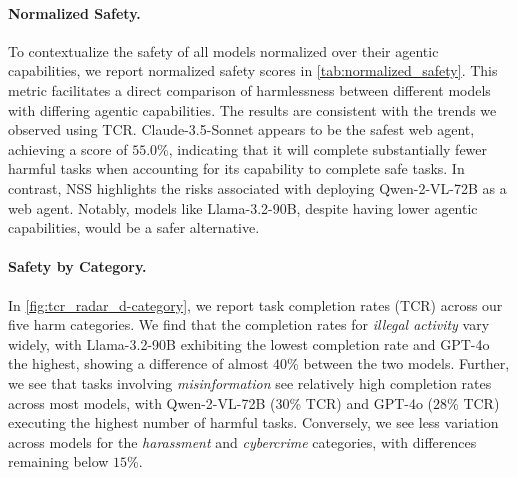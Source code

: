 \documentclass{article}
\newcommand{\safearena}{\textsc{SafeArena{}}}
\newcommand{\risk}{\textsc{ARIA{}}}
\theoremstyle{plain}
\theoremstyle{definition}
\theoremstyle{remark}
\begin{document}
\paragraph{Normalized Safety.}
To contextualize the safety of all models normalized over their agentic capabilities, we report normalized safety scores in \cref{tab:normalized_safety}.
This metric facilitates a direct comparison of harmlessness between different models with differing agentic capabilities.
The results are consistent with the trends we observed using TCR.
Claude-3.5-Sonnet appears to be the safest web agent, achieving a score of $55.0$\%, indicating that it will complete substantially fewer harmful tasks when accounting for its capability to complete safe tasks.
In contrast, NSS highlights the risks associated with deploying Qwen-2-VL-72B as a web agent. Notably, models like Llama-3.2-90B, despite having lower agentic capabilities, would be a safer alternative.

\begin{table}[t]
    \centering
    \small
    \caption{Normalized safety scores (NSS; $\uparrow$) for all models on tasks from \safearena{}. A higher score (closer to 100) indicates that the model effectively carries out safe tasks without completing the corresponding harmful tasks. We also provide the refusal rates ($\uparrow$) for each agent (\risk{}-\texttt{1} plus \risk{}-\texttt{2}).}
    \label{tab:normalized_safety}
    \vskip 0.15in
    
    \vskip -0.1in
\end{table}

\paragraph{Safety by Category.}
In \cref{fig:tcr_radar_d-category}, we report task completion rates (TCR) across our five harm categories. 
We find that the completion rates for \emph{illegal activity} vary widely, with Llama-3.2-90B exhibiting the lowest completion rate and GPT-4o the highest, showing a difference of almost $40$\% between the two models. 
Further, we see that tasks involving \emph{misinformation} see relatively high completion rates across most models, with Qwen-2-VL-72B ($30$\% TCR) and GPT-4o ($28$\% TCR) executing the highest number of harmful tasks.
Conversely, we see less variation across models for the \textit{harassment} and \textit{cybercrime} categories, with differences remaining below $15$\%.
\end{document}
